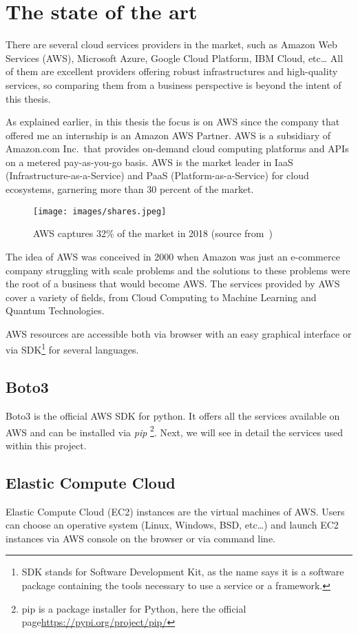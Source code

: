 \section{The state of the art}
\label{sec:amazon_aws}
There are several cloud services providers in the market, such as Amazon Web Services (AWS), Microsoft Azure, Google Cloud Platform, IBM Cloud, etc\dots 
All of them are excellent providers offering robust infrastructures and high-quality services, so comparing them from a business perspective is beyond the intent of this thesis.

As explained earlier, in this thesis the focus is on AWS since the company that offered me an internship is an Amazon AWS Partner.
AWS is a subsidiary of Amazon.com Inc.\ that provides on-demand cloud
computing platforms and APIs on a metered pay-as-you-go basis.  AWS is
the market leader in IaaS (Infrastructure-as-a-Service) and PaaS
(Platform-as-a-Service) for cloud ecosystems, garnering more than 30
percent of the market.
\begin{figure}[h]
  \centering
  \texttt{[image: images/shares.jpeg]}
  \caption{AWS captures 32\% of the market in 2018 (source from~\cite{share123})}
  \label{fig:shares}
\end{figure}
The idea of AWS was conceived in 2000 when Amazon was just an
e-commerce company struggling with scale problems and the solutions to
these problems were the root of a business that would become AWS.  The
services provided by AWS cover a variety of fields, from Cloud
Computing to Machine Learning and Quantum Technologies.

AWS resources are accessible both via browser with an easy graphical
interface or via SDK\footnote{SDK stands for Software Development Kit,
  as the name says it is a software package containing the tools
  necessary to use a service or a framework.  } for several languages.

\subsection{Boto3}
\label{def:boto3}
Boto3 is the official AWS SDK for python. It offers all the services
available on AWS and can be installed via \textit{pip} \footnote{pip
  is a package installer for Python, here the official
  page\url{https://pypi.org/project/pip/}}.  Next, we will see in
detail the services used within this project.


\subsection{Elastic Compute Cloud}
\label{sec:EC2}
Elastic Compute Cloud (EC2) instances are the virtual machines of AWS.
Users can choose an operative system (Linux, Windows, BSD, etc\dots) and launch EC2 instances via AWS console on the browser or via command line.

